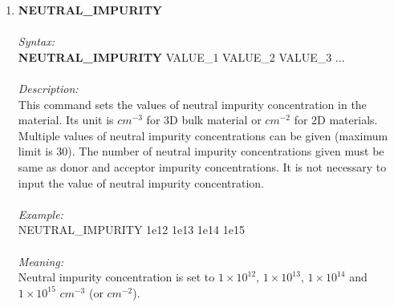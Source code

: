 \documentclass[12pt]{article}
\begin{document}
\begin{enumerate}
    \item \textbf{NEUTRAL\_IMPURITY}   \\ \\
    \textit{Syntax:} \\
    \textbf{NEUTRAL\_IMPURITY} VALUE\_1 VALUE\_2 VALUE\_3 ... \\ \\
    \textit{Description:} \\
    This command sets the values of neutral impurity concentration in the material. Its unit is $cm^{-3}$ for 3D bulk material or $cm^{-2}$ for 2D materials. Multiple values of neutral impurity concentrations can be given (maximum limit is 30). The number of neutral impurity concentrations given must be same as donor and acceptor impurity concentrations. It is not necessary to input the value of neutral impurity concentration. \\ \\
    \textit{Example:} \\
    NEUTRAL\_IMPURITY 1e12 1e13 1e14 1e15 \\ \\
    \textit{Meaning:} \\   
    Neutral impurity concentration is set to $1 \times 10^{12}$, $1 \times 10^{13}$, $1 \times 10^{14}$ and $1 \times 10^{15}$ $cm^{-3}$ (or $cm^{-2}$). \\ \\



\end{enumerate}
\end{document}
